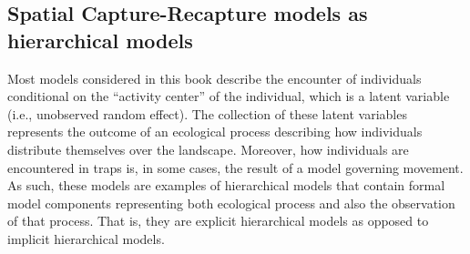 \subsection{Spatial Capture-Recapture models as hierarchical models}

Most models considered in this book describe the encounter of
individuals conditional on the ``activity center'' of the individual,
which is a latent variable (i.e., unobserved random effect).  The
collection of these latent variables represents the outcome of an
ecological process describing how individuals distribute themselves
over the landscape. Moreover, how individuals are encountered in traps
is, in some cases, the result of a model governing movement.  As such,
these models are examples of hierarchical models that contain formal
model components representing both ecological process and also the
observation of that process. That is, they are explicit hierarchical
models \citep{royle_dorazio:2008} as opposed to implicit hierarchical
models.




